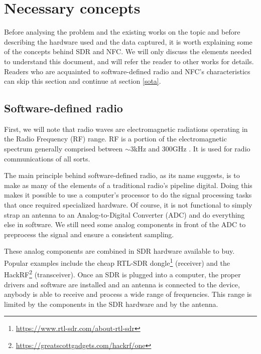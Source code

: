 \section{Necessary concepts}

Before analysing the problem and the existing works on the topic and before describing the hardware used and the data captured, it is worth explaining some of the concepts behind SDR and NFC. We will only discuss the elements needed to understand this document, and will refer the reader to other works for details. Readers who are acquainted to software-defined radio and NFC's characteristics can skip this section and continue at section \ref{sota}.

\subsection{Software-defined radio}

First, we will note that radio waves are electromagnetic radiations operating in the Radio Frequency (RF) range. RF is a portion of the electromagnetic spectrum generally comprised between $\sim$3kHz and 300GHz \cite{pritchard_elttam}. It is used for radio communications of all sorts.

The main principle behind software-defined radio, as its name suggests, is to make as many of the elements of a traditional radio's pipeline digital. Doing this makes it possible to use a computer's processor to do the signal processing tasks that once required specialized hardware. Of course, it is not functional to simply strap an antenna to an Analog-to-Digital Converter (ADC) and do everything else in software. We still need some analog components in front of the ADC to preprocess the signal and ensure a consistent sampling. \cite{wiki_software-defined_2020, hackaday_your_2015, spiess_286_2019}

These analog components are combined in SDR hardware available to buy. Popular examples include the cheap RTL-SDR dongle\footnote{\url{https://www.rtl-sdr.com/about-rtl-sdr}} (receiver) and the HackRF\footnote{\url{https://greatscottgadgets.com/hackrf/one}} (transceiver). Once an SDR is plugged into a computer, the proper drivers and software are installed and an antenna is connected to the device, anybody is able to receive and process a wide range of frequencies. This range is limited by the components in the SDR hardware and by the antenna.

